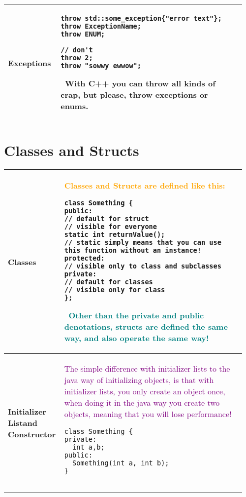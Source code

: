 \documentclass[main.tex,fontsize=8pt,paper=a4,paper=portrait,DIV=calc,]{scrartcl}
\begin{document}
\begin{table}[ht!]
\begin{tabular}{|m{0.2\linewidth}|m{0.755\linewidth}|}
\\
\hline
Exceptions & 
\begin{lstlisting}
throw std::some_exception{"error text"};
throw ExceptionName;
throw ENUM;

// don't
throw 2;
throw "sowwy ewwow";
\end{lstlisting}
\, \newline
With C++ you can throw all kinds of crap, but please, throw exceptions or enums.\\
\hline
\end{tabular}
\end{table}
\pagebreak
\begin{table}[ht!]
\section{Classes and Structs}
\begin{tabular}{|m{0.2\linewidth}|m{0.755\linewidth}|}
\hline
Classes &
\textcolor{orange}{Classes and Structs are defined like this:}\newline
\begin{lstlisting}
class Something { 
public:
// default for struct
// visible for everyone
static int returnValue();
// static simply means that you can use this function without an instance!
protected:
// visible only to class and subclasses
private:
// default for classes
// visible only for class
};
\end{lstlisting}
\, \newline
\textcolor{teal}{Other than the private and public denotations, structs are defined the same way, and also operate the same way!}\\
\hline
\textbf{Initializer List\newline and Constructor} &
\textcolor{purple}{The simple difference with initializer lists to the java way of initializing objects, is that with initializer lists, you only create an object once, when doing it in the java way you create two objects, meaning that you will lose performance!}\newline
\begin{lstlisting}
class Something {
private:
  int a,b;
public:
  Something(int a, int b);
}


\end{lstlisting}
\end{tabular}
\end{table}
\end{document}
